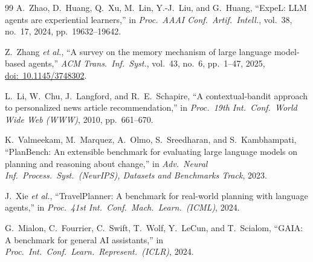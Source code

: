 \documentclass[11pt,a4paper]{article}
\begin{document}
\begin{thebibliography}{99}
A.~Zhao, D.~Huang, Q.~Xu, M.~Lin, Y.-J.~Liu, and G.~Huang, ``ExpeL: LLM agents are experiential learners,''
in \emph{Proc.\ AAAI Conf.\ Artif.\ Intell.}, vol.~38, no.~17, 2024, pp.~19632--19642.

Z.~Zhang \emph{et al.}, ``A survey on the memory mechanism of large language model-based agents,''
\emph{ACM Trans.\ Inf.\ Syst.}, vol.~43, no.~6, pp.~1--47, 2025,
\href{https://doi.org/10.1145/3748302}{doi:~10.1145/3748302}.

L.~Li, W.~Chu, J.~Langford, and R.~E.~Schapire, ``A contextual-bandit approach to personalized news article
recommendation,'' in \emph{Proc.\ 19th Int.\ Conf.\ World Wide Web (WWW)}, 2010, pp.~661--670.

K.~Valmeekam, M.~Marquez, A.~Olmo, S.~Sreedharan, and S.~Kambhampati, ``PlanBench: An extensible benchmark
for evaluating large language models on planning and reasoning about change,'' in \emph{Adv.\ Neural Inf.\
Process.\ Syst.\ (NeurIPS), Datasets and Benchmarks Track}, 2023.

J.~Xie \emph{et al.}, ``TravelPlanner: A benchmark for real-world planning with language agents,'' in
\emph{Proc.\ 41st Int.\ Conf.\ Mach.\ Learn.\ (ICML)}, 2024.

G.~Mialon, C.~Fourrier, C.~Swift, T.~Wolf, Y.~LeCun, and T.~Scialom, ``GAIA: A benchmark for general AI
assistants,'' in \emph{Proc.\ Int.\ Conf.\ Learn.\ Represent.\ (ICLR)}, 2024.

\end{thebibliography}
\endgroup
\end{document}

